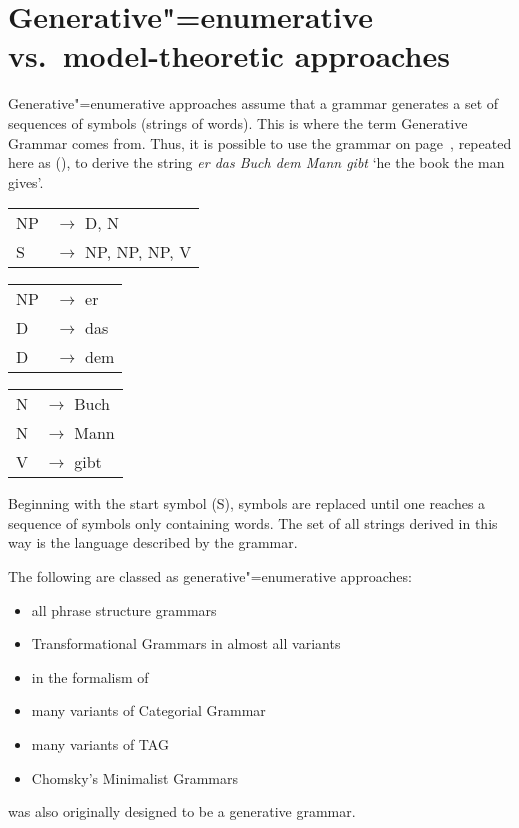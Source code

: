 
\chapter{Generative"=enumerative vs.\ model-theoretic approaches}
\label{Abschnitt-Generativ-Modelltheoretisch}


Generative"=enumerative approaches assume that a grammar generates a set of sequences of symbols (strings of words).
This is where the term Generative Grammar comes from. Thus, it is possible to use the grammar on
page~\pageref{bsp-grammatik-psg}, repeated here as (), to derive the string \emph{er das Buch dem Mann gibt}
`he the book the man gives'.
\ea
\label{bsp-grammatik-psg-zwei}
\begin{tabular}[t]{@{}l@{ }l}
{NP} & {$\to$ D, N}\\          
{S}  & {$\to$ NP, NP, NP, V}
\end{tabular}\hspace{2cm}%
\begin{tabular}[t]{@{}l@{ }l}
{NP} & {$\to$ er}\\
{D}  & {$\to$ das}\\
{D}  & {$\to$ dem}\\
\end{tabular}\hspace{8mm}
\begin{tabular}[t]{@{}l@{ }l}
{N} & {$\to$ Buch}\\
{N} & {$\to$ Mann}\\
{V} & {$\to$ gibt}\\
\end{tabular}
\z
Beginning with the start symbol (S), symbols are replaced until one reaches a sequence of symbols only containing words.
The set of all strings derived in this way is the language described by the grammar.

The following are classed as generative"=enumerative approaches:
\begin{itemize}
\item all phrase structure grammars
\item Transformational Grammars in almost all variants
\item \gpsg in the formalism of \citet*{GKPS85a}
\item many variants of Categorial Grammar\indexcg
\item many variants of TAG\indextag
\item Chomsky's Minimalist Grammars
\end{itemize}
\lfg was also originally designed to be a generative grammar.

